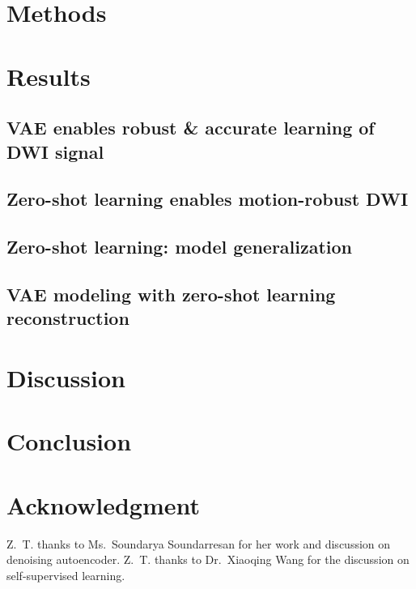 \documentclass[journal,twoside,web]{ieeecolor}
\begin{document}
	\section{Methods}



	\section{Results}

	\subsection{VAE enables robust \& accurate learning of DWI signal}

	\subsection{Zero-shot learning enables motion-robust DWI}

	\subsection{Zero-shot learning: model generalization}

	\subsection{VAE modeling with zero-shot learning reconstruction}


	\section{Discussion}


	\section{Conclusion}


	\section*{Acknowledgment}

	Z.~T. thanks to Ms.~Soundarya Soundarresan for
	her work and discussion on denoising autoencoder.
	Z.~T. thanks to Dr.~Xiaoqing Wang for
	the discussion on self-supervised learning.

	
	
\end{document}
